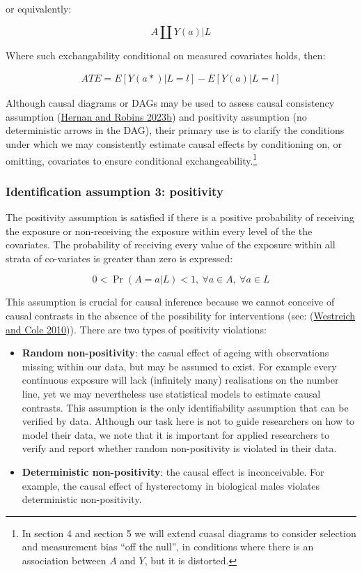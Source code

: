 \documentclass[
  singlecolumn]{report}
\begin{document}
or equivalently:

\[A \coprod  Y(a)|L\]

Where such exchangability conditional on measured covariates holds,
then:

\[
\begin{aligned}
ATE = E[Y(a*)|L = l] - E[Y(a)|L = l] 
\end{aligned}
\]

Although causal diagrams or DAGs may be used to assess causal
consistency assumption (\protect\hyperlink{ref-hernan2023b}{Hernan and
Robins 2023b}) and positivity assumption (no deterministic arrows in the
DAG), their primary use is to clarify the conditions under which we may
consistently estimate causal effects by conditioning on, or omitting,
covariates to ensure conditional exchangeability.\footnote{In section 4
  and section 5 we will extend cuasal diagrams to consider selection and
  measurement bias ``off the null'', in conditions where there is an
  association between \(A\) and \(Y\), but it is distorted.}

\hypertarget{identification-assumption-3-positivity}{%
\subsubsection{Identification assumption 3:
positivity}\label{identification-assumption-3-positivity}}

The positivity assumption is satisfied if there is a positive
probability of receiving the exposure or non-receiving the exposure
within every level of the the covariates. The probability of receiving
every value of the exposure within all strata of co-variates is greater
than zero is expressed:

\begin{equation}
0 < \Pr(A=a|L)<1, ~ \forall a \in A, ~ \forall a \in L
\end{equation}

This assumption is crucial for causal inference because we cannot
conceive of causal contrasts in the absence of the possibility for
interventions (see: (\protect\hyperlink{ref-westreich2010}{Westreich and
Cole 2010})). There are two types of positivity violations:

\begin{itemize}
\item
  \textbf{Random non-positivity}: the casual effect of ageing with
  observations missing within our data, but may be assumed to exist. For
  example every continuous exposure will lack (infinitely many)
  realisations on the number line, yet we may nevertheless use
  statistical models to estimate causal contrasts. This assumption is
  the only identifiability assumption that can be verified by data.
  Although our task here is not to guide researchers on how to model
  their data, we note that it is important for applied researchers to
  verify and report whether random non-positivity is violated in their
  data.
\item
  \textbf{Deterministic non-positivity}: the causal effect is
  inconceivable. For example, the causal effect of hysterectomy in
  biological males violates deterministic non-positivity.
\end{itemize}
\end{document}
